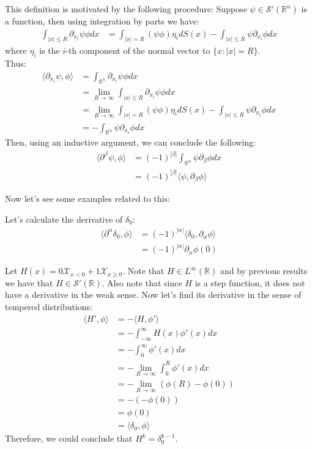 \begin{note}{}
  This definition is motivated by the following procedure:
  Suppose $\psi\in\mathcal{S}'(\mathbb{R}^n)$ is a function, then using integration by parts we have:
  \begin{align*}
    \int_{|x|\leq R}\partial_{x_i}\psi \phi dx &= \int_{|x|= R}(\psi\phi)\eta_i dS(x) - \int_{|x|\leq R} \psi \partial_{x_i}\phi dx
  \end{align*}
  where $\eta_i$ is the $i$-th component of the normal vector to $\{x:|x| = R\}$.\\
  Thus:
  \begin{align*}
    \langle \partial_{x_i}\psi,\phi \rangle &= \int_{\mathbb{R}^n}\partial_{x_i}\psi\phi dx \\
    &= \lim_{R\rightarrow \infty} \int_{|x|\leq R}\partial_{x_i}\psi \phi dx\\
    &= \lim_{R\rightarrow \infty} \int_{|x|= R}(\psi\phi)\eta_i dS(x) - \int_{|x|\leq R} \psi \partial_{x_i}\phi dx\\
    &= -\int_{\mathbb{R}^n}\psi\partial_{x_i}\phi dx
  \end{align*}
  Then, using an inductive argument, we can conclude the following:
  \begin{align*}
    \langle \partial^{\beta}\psi, \phi \rangle &= (-1)^{|\beta|}\int_{\mathbb{R}^n}\psi\partial_{\beta}\phi dx\\
    &=(-1)^{|\beta|}\langle \psi, \partial_{\beta}\phi \rangle
  \end{align*}
\end{note}
Now let’s see some examples related to this:
\begin{example}{}
  Let’s calculate the derivative of $\delta_0$:
  \begin{align*}
    \langle \partial^{\alpha}\delta_0, \phi \rangle &= (-1)^{|\alpha|}\langle \delta_0,\partial_{\alpha}\phi \rangle\\
    &= (-1)^{|\alpha|}\partial_{\alpha}\phi(0)
  \end{align*}
\end{example}
\begin{example}{}
  Let $H(x)=0\mathcal{X}_{x<0}+1\mathcal{X}_{x\geq 0}$.
  Note that $H\in L^\infty(\mathbb{R})$ and by previous results we have that $H\in\mathcal{S}'(\mathbb{R})$. Also note that since $H$ is a step function, it does not have a derivative in the weak sense.
  Now let’s find its derivative in the sense of tempered distributions:
  \begin{align*}
    \langle H',\phi \rangle&=-\langle H, \phi'\rangle \\
    &=-\int_{-\infty}^{\infty}H(x)\phi'(x)dx\\
    &=-\int_{0}^{\infty}\phi'(x)dx\\
    &=-\lim_{R\rightarrow\infty}\int_{0}^{R}\phi'(x)dx\\
    &=-\lim_{R\rightarrow\infty}(\phi(R)-\phi(0))\\
    &=-(-\phi(0))\\
    &=\phi(0)\\
    &=\langle \delta_0, \phi\rangle
  \end{align*}
  Therefore, we could conclude that $H^{k}=\delta_0^{k-1}$.
\end{example}
